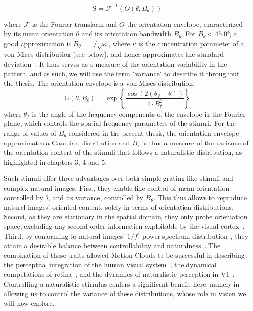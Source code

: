 \begin{equation}
    \text{S} = \mathcal{F}^{-1} (O(\theta, B_{\theta}))
\end{equation}

where $\mathcal{F}$ is the Fourier transform and $O$ the orientation envelope, characterized by its mean orientation $\theta$ and its orientation bandwidth $B_\theta$. For $B_\theta < 45.0$°, a good approximation is $B_\theta = 1/\sqrt{\kappa}$, where $\kappa$ is the concentration parameter of a von Mises distribution (see below), and hence approximates the standard deviation~\cite{swindale1998orientation}. It thus serves as a measure of the orientation variability in the pattern, and as such, we will use the term "variance" to describe it throughout the thesis.
The orientation envelope is a von Mises distribution:
\begin{equation}\label{eq_orientation_mc}
O(\theta, B_{\theta}) = 
\exp 
\left\{
\frac{\cos (2 (\theta_f - \theta)) }
{4 \cdot B_{\theta}^2}
\right\}
\end{equation}
where $\theta_f$ is the angle of the frequency components of the envelope in the Fourier plane, which controls the spatial frequency parameters of the stimuli. For the range of values of $B_\theta$ considered in the present thesis, the orientation envelope approximates a Gaussian distribution and $B_\theta$ is thus a measure of the variance of the orientation content of the stimuli that follows a naturalistic distribution, as highlighted in chapters 3, 4 and 5. 

Such stimuli offer three advantages over both simple grating-like stimuli and complex natural images. First, they enable fine control of mean orientation, controlled by $\theta$, and its variance, controlled by $B_\theta$. This thus allows to reproduce natural images' oriented content, solely in terms of orientation distributions. Second, as they are stationary in the spatial domain, they only probe orientation space, excluding any second-order information exploitable by the visual cortex~\cite{johnson2004first}. Third, by conforming to natural images' $1/f^2$ power spectrum distribution~\cite{field1987relations}, they attain a desirable balance between controllability and naturalness~\cite{rust2005praise}. The combination of these traits allowed Motion Clouds to be successful in describing the perceptual integration of the human visual system~\cite{simoncini2012more}, the dynamical computations of retina~\cite{ravello2019speed}, and the dynamics of naturalistic perception in \gls{V1}~\cite{vacher2017synthese}. Controlling a naturalistic stimulus confers a significant benefit here, namely in allowing us to control the variance of these distributions, whose role in vision we will now explore.



